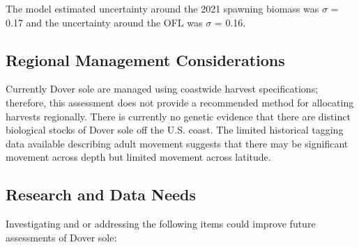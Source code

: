 \documentclass[11pt,
  english,
  a4paper,
]{article}
\begin{document}
\leavevmode\tagmcend\tagstructend


The model estimated uncertainty around the 2021 spawning biomass was {\(\sigma\)\leavevmode\tagmcend\tagstructend} = 0.17 and the uncertainty around the OFL was {\(\sigma\)\leavevmode\tagmcend\tagstructend} = 0.16.

\leavevmode\tagmcend\tagstructend\par


\hypertarget{regional-management-considerations}{%
\subsection{Regional Management Considerations}\label{regional-management-considerations}}

\leavevmode\tagmcend\tagstructend


Currently Dover sole are managed using coastwide harvest specifications; therefore, this assessment does not provide a recommended method for allocating harvests regionally. There is currently no genetic evidence that there are distinct biological stocks of Dover sole off the U.S. coast. The limited historical tagging data available describing adult movement suggests that there may be significant movement across depth but limited movement across latitude.

\leavevmode\tagmcend\tagstructend\par


\hypertarget{research-and-data-needs-1}{%
\subsection{Research and Data Needs}\label{research-and-data-needs-1}}

\leavevmode\tagmcend\tagstructend


Investigating and or addressing the following items could improve future assessments of Dover sole:

\leavevmode\tagmcend\tagstructend\par
\end{document}
